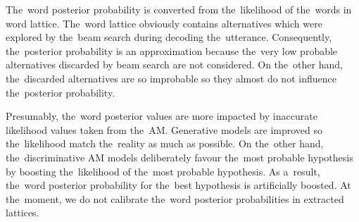 
The~word posterior probability is converted from the~likelihood of the~words in word lattice. 
The~word lattice obviously contains alternatives which were explored by the~beam search during decoding the~utterance.
Consequently, the~posterior probability is an approximation because the~very low probable alternatives discarded by beam search are not considered.
On the~other hand, the~discarded alternatives are so improbable so they almost do not influence the~posterior probability.

Presumably, the~word posterior values are more impacted by inaccurate likelihood values taken from the~\acl{AM}.
Generative models are improved so the~likelihood match the~reality as much as possible.
On the~other hand, the~discriminative \ac{AM} models deliberately favour the~most probable hypothesis by boosting the~likelihood of the~most probable hypothesis.
As a~result, the~word posterior probability for the~best hypothesis is artificially boosted.
At the~moment, we do not calibrate the~word posterior probabilities in extracted lattices.

